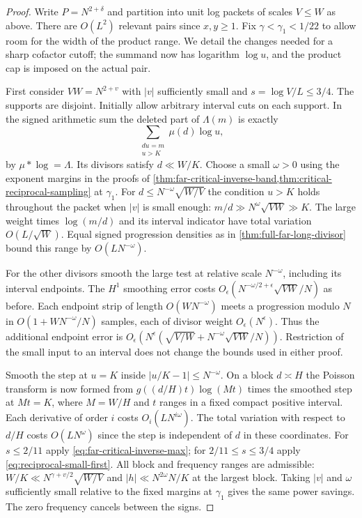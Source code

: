 \documentclass[11pt,a4paper]{article}
\numberwithin{equation}{section}
\begin{document}
\begin{proof}
Write $P=N^{2+\delta}$ and partition into unit log packets of
scales $V\le W$ as above. There are $O(L^2)$ relevant pairs
since $x,y\ge1$. Fix $\gamma<\gamma_1<1/22$ to allow room for
the width of the product range. We detail the changes needed
for a sharp cofactor cutoff; the summand now has logarithm
$\log u$, and the product cap is imposed on the actual pair.

First consider $VW=N^{2+v}$ with $|v|$ sufficiently small
and $s=\log V/L\le3/4$. The supports are disjoint. Initially
allow arbitrary interval cuts on each support. In the signed
arithmetic sum the deleted part of $\Lambda(m)$ is exactly
\[
 \sum_{\substack{du=m\\u>K}}\mu(d)\log u ,
\]
by $\mu*\log=\Lambda$. Its divisors satisfy $d\ll W/K$.
Choose a small $\omega>0$ using the exponent margins in the
proofs of \cref{thm:far-critical-inverse-band,thm:critical-reciprocal-sampling}
at $\gamma_1$. For $d\le N^{-\omega}\sqrt{W/V}$ the condition
$u>K$ holds throughout the packet when $|v|$ is small enough:
$m/d\gg N^\omega\sqrt{VW}\gg K$. The large weight times
$\log(m/d)$ and its interval indicator have total variation
$O(L/\sqrt W)$. Equal signed progression densities as in
\cref{thm:full-far-long-divisor} bound this range by $O(LN^{-\omega})$.

For the other divisors smooth the large test at relative scale
$N^{-\omega}$, including its interval endpoints. The $H^1$
smoothing error costs $O_\epsilon(N^{-\omega/2+\epsilon}
\sqrt{VW}/N)$ as before. Each endpoint strip of length
$O(WN^{-\omega})$ meets a progression modulo $N$ in
$O(1+WN^{-\omega}/N)$ samples, each of divisor weight
$O_\epsilon(N^\epsilon)$. Thus the additional endpoint error
is $O_\epsilon(N^\epsilon(\sqrt{V/W}+N^{-\omega}\sqrt{VW}/N))$.
Restriction of the small input to an interval does not change
the bounds used in either proof.

Smooth the step at $u=K$ inside $|u/K-1|\le N^{-\omega}$.
On a block $d\asymp H$ the Poisson transform is now formed
from $g((d/H)t)\log(Mt)$ times the smoothed step at $Mt=K$,
where $M=W/H$ and $t$ ranges in a fixed compact positive
interval. Each derivative of order $i$ costs $O_i(LN^{i\omega})$.
The total variation with respect to $d/H$ costs $O(LN^\omega)$
since the step is independent of $d$ in these coordinates.
For $s\le2/11$ apply \eqref{eq:far-critical-inverse-max};
for $2/11\le s\le3/4$ apply \eqref{eq:reciprocal-small-first}.
All block and frequency ranges are admissible: $W/K\ll
N^{\gamma+v/2}\sqrt{W/V}$ and $|h|\ll N^{2\omega}N/K$
at the largest block. Taking $|v|$ and $\omega$ sufficiently
small relative to the fixed margins at $\gamma_1$ gives the
same power savings. The zero frequency cancels between the signs.


\end{proof}
\end{document}
